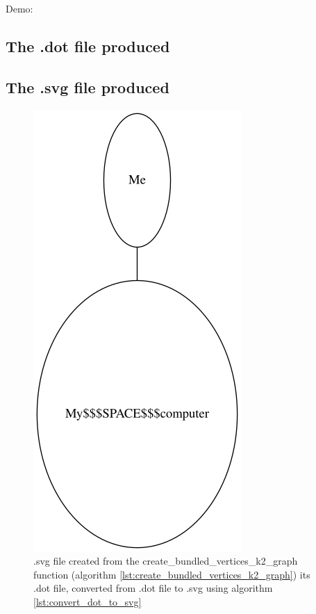 Demo:



\subsection{The .dot file produced}



\subsection{The .svg file produced}

\begin{figure}[!htbp]
  \includegraphics[]{create_bundled_vertices_k2_graph.png}
  \caption{
    .svg file created from the create\_bundled\_vertices\_k2\_graph function 
    (algorithm \ref{lst:create_bundled_vertices_k2_graph}) its .dot file, 
    converted from .dot file to .svg 
    using algorithm \ref{lst:convert_dot_to_svg}
  }
  \label{fig:create_bundled_vertices_k2_graph.svg}
\end{figure}

